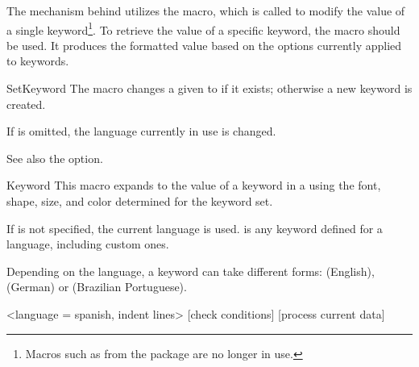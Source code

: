 \documentclass[a4paper, 11pt]{article}
\begin{document}

The mechanism behind  utilizes the  macro, which is called to modify the value of a single keyword\footnote{Macros such as  from the  package are no longer in use.}. To retrieve the value of a specific keyword, the  macro should be used. It produces the formatted value based on the options currently applied to keywords.

\begin{Macrodef}{SetKeyword}{}{}
    The macro  changes a given  to  if it exists; otherwise a new keyword is created.

    If  is omitted, the language currently in use is changed.

    See also the  option.
\end{Macrodef}

\begin{Macrodef}{Keyword}{}{}
    This macro expands to the value of a keyword in a  using the font, shape, size, and color determined for the keyword set.

    If  is not specified, the current language is used.  is any keyword defined for a language, including custom ones.
\end{Macrodef}

\begin{PDExample}
    Depending on the language, a keyword can take different forms:  (English),  (German) or  (Brazilian Portuguese).
\end{PDExample}

\begin{PDExample}
    \begin{algorithmic}
        <language = spanish, indent lines>
        [check conditions]
                [process current data]
            \EndWhile
        \Else
        \EndIf
    \end{algorithmic}
\end{PDExample}
\end{document}
